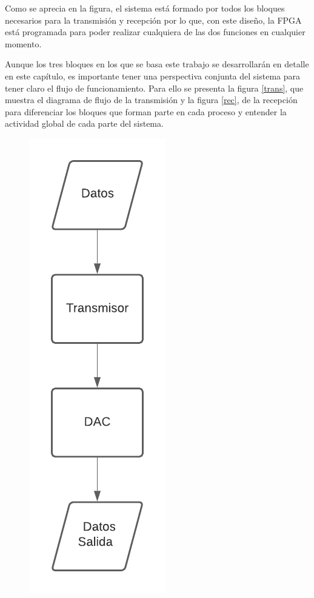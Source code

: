 Como se aprecia en la figura, el sistema está formado por todos los bloques necesarios para 
la transmisión y recepción por lo que, con este diseño, la FPGA está programada para poder 
realizar cualquiera de las dos funciones en cualquier momento.

Aunque los tres bloques en los que se basa este trabajo
se desarrollarán en detalle en este capítulo, es importante tener una
perspectiva conjunta del sistema para tener claro
el flujo de funcionamiento. Para ello se presenta
la figura \ref{trans}, que muestra el diagrama de flujo de la transmisión
y la figura \ref{rec}, de la recepción para diferenciar los bloques que forman parte en cada 
proceso y entender la actividad global de cada parte del sistema. 

\begin{figure}[ht]
	\centering
	  \begin{minipage}{7cm}
		\centering
		\includegraphics[scale=0.83]{./figuras/flujo_trans.pdf}

\end{minipage}
\end{figure}

